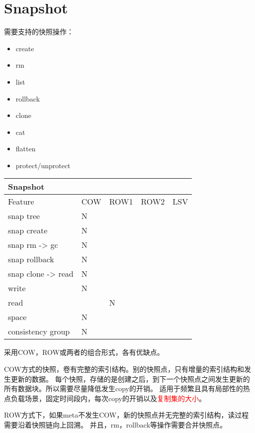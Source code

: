 \chapter{Snapshot}

\begin{tcolorbox}
需要支持的快照操作：
    \begin{itemize}
        \item create
        \item rm
        \item list
        \item rollback
        \item clone
        \item cat
        \item flatten
        \item protect/unprotect
    \end{itemize}
\end{tcolorbox}

\begin{tabular}{|s|p{0.6cm}|p{0.6cm}|p{0.6cm}|p{0.6cm}| }
    \hline
      {Snapshot} \\
    \hline
    Feature & COW & ROW1 & ROW2 & LSV \\
    \hline
    snap tree & N &  & & \\
    \hline
    snap create & N &  & & \\
    \hline
    snap rm -> gc & N &  & & \\
    \hline
    snap rollback & N &  & & \\
    \hline
    snap clone -> read & N & & & \\
    \hline
    write & N &  & & \\
    \hline
    read & & N & & \\
    \hline
    space & N &  & & \\
    \hline
    consistency group & N &  & & \\
    \hline
\end{tabular}

采用COW，ROW或两者的组合形式，各有优缺点。

COW方式的快照，卷有完整的索引结构。别的快照点，只有增量的索引结构和发生更新的数据。
每个快照，存储的是创建之后，到下一个快照点之间发生更新的所有数据块。所以需要尽量降低发生copy的开销。
适用于频繁且具有局部性的热点负载场景，固定时间段内，每次copy的开销以及\textcolor{red}{复制集的大小}。

ROW方式下，如果meta不发生COW，新的快照点并无完整的索引结构，读过程需要沿着快照链向上回溯。
并且，rm，rollback等操作需要合并快照点。

